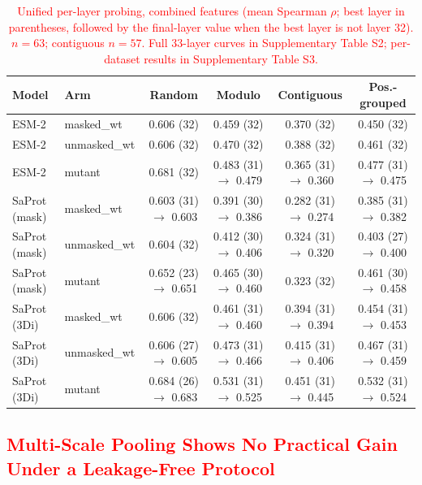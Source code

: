 \documentclass[11pt,a4paper]{article}
\newcommand{\revised}[1]{\textcolor{red}{#1}}
\begin{document}
\begin{table}[ht]
\centering
\caption{\revised{Unified per-layer probing, combined features (mean Spearman
$\rho$; best layer in parentheses, followed by the final-layer value when the best
layer is not layer 32). $n = 63$; contiguous $n = 57$. Full 33-layer curves in
Supplementary Table S2; per-dataset results in Supplementary Table S3.}}
\label{tab:probing}
\begin{tabular}{llcccc}
\toprule
Model & Arm & Random & Modulo & Contiguous & Pos.-grouped \\
\midrule
ESM-2 & masked\_wt   & 0.606 (32) & 0.459 (32) & 0.370 (32) & 0.450 (32) \\
ESM-2 & unmasked\_wt & 0.606 (32) & 0.470 (32) & 0.388 (32) & 0.461 (32) \\
ESM-2 & mutant       & 0.681 (32) & 0.483 (31) $\rightarrow$ 0.479 & 0.365 (31) $\rightarrow$ 0.360 & 0.477 (31) $\rightarrow$ 0.475 \\
\midrule
SaProt (mask) & masked\_wt   & 0.603 (31) $\rightarrow$ 0.603 & 0.391 (30) $\rightarrow$ 0.386 & 0.282 (31) $\rightarrow$ 0.274 & 0.385 (31) $\rightarrow$ 0.382 \\
SaProt (mask) & unmasked\_wt & 0.604 (32) & 0.412 (30) $\rightarrow$ 0.406 & 0.324 (31) $\rightarrow$ 0.320 & 0.403 (27) $\rightarrow$ 0.400 \\
SaProt (mask) & mutant       & 0.652 (23) $\rightarrow$ 0.651 & 0.465 (30) $\rightarrow$ 0.460 & 0.323 (32) & 0.461 (30) $\rightarrow$ 0.458 \\
\midrule
SaProt (3Di) & masked\_wt   & 0.606 (32) & 0.461 (31) $\rightarrow$ 0.460 & 0.394 (31) $\rightarrow$ 0.394 & 0.454 (31) $\rightarrow$ 0.453 \\
SaProt (3Di) & unmasked\_wt & 0.606 (27) $\rightarrow$ 0.605 & 0.473 (31) $\rightarrow$ 0.466 & 0.415 (31) $\rightarrow$ 0.406 & 0.467 (31) $\rightarrow$ 0.459 \\
SaProt (3Di) & mutant       & 0.684 (26) $\rightarrow$ 0.683 & 0.531 (31) $\rightarrow$ 0.525 & 0.451 (31) $\rightarrow$ 0.445 & 0.532 (31) $\rightarrow$ 0.524 \\
\bottomrule
\end{tabular}
\end{table}

\subsection{\revised{Multi-Scale Pooling Shows No Practical Gain Under a Leakage-Free Protocol}}
\end{document}
